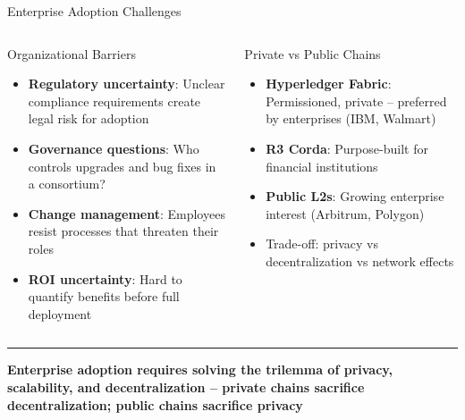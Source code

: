 \documentclass[8pt,aspectratio=169]{beamer}
\newcommand{\bottomnote}[1]{\vfill\vspace{-2mm}\textcolor{mllavender2}{\rule{\textwidth}{0.4pt}}\vspace{1mm}\footnotesize\textbf{#1}}
\begin{document}
\begin{frame}{Enterprise Adoption Challenges}
\begin{columns}[T]
\begin{block}{Organizational Barriers}
\footnotesize
\begin{itemize}
  \item \textbf{Regulatory uncertainty}: Unclear compliance requirements create legal risk for adoption
  \item \textbf{Governance questions}: Who controls upgrades and bug fixes in a consortium?
  \item \textbf{Change management}: Employees resist processes that threaten their roles
  \item \textbf{ROI uncertainty}: Hard to quantify benefits before full deployment
\end{itemize}
\end{block}
\vspace{2mm}
\begin{exampleblock}{Private vs Public Chains}
\footnotesize
\begin{itemize}
  \item \textbf{Hyperledger Fabric}: Permissioned, private -- preferred by enterprises (IBM, Walmart)
  \item \textbf{R3 Corda}: Purpose-built for financial institutions
  \item \textbf{Public L2s}: Growing enterprise interest (Arbitrum, Polygon)
  \item Trade-off: privacy vs decentralization vs network effects
\end{itemize}
\end{exampleblock}
\end{columns}
\bottomnote{Enterprise adoption requires solving the trilemma of privacy, scalability, and decentralization -- private chains sacrifice decentralization; public chains sacrifice privacy}
\end{frame}
\end{document}
